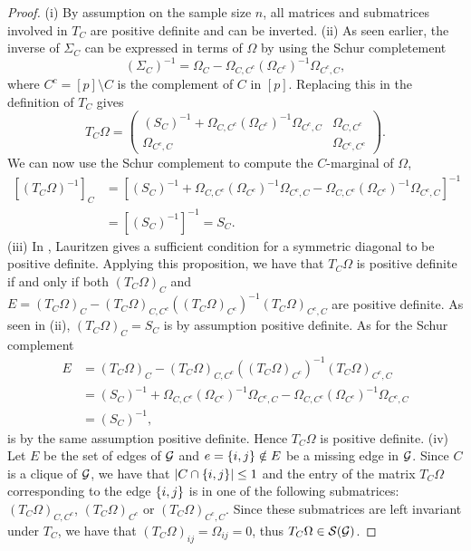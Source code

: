 \begin{proof}
    (i) By assumption on the sample size $n$, all matrices and submatrices involved in $T_C$ are positive definite and can be inverted.
    \newline
    (ii) As seen earlier, the inverse of $\Sigma_C$ can be expressed in terms of $\Omega$ by using the Schur completement
    \begin{equation*}
        (\Sigma_C)^{-1} = \Omega_C - \Omega_{C, C^c}(\Omega_{C^c})^{-1}\Omega_{C^c, C},
    \end{equation*}
    where $C^c = [p] \setminus C$ is the complement of $C$ in $[p]$. Replacing this in the definition of $T_C$ gives
    \begin{equation} \label{eq-tc-2}
        T_C \Omega = \begin{pmatrix}
            (S_C)^{-1} + \Omega_{C, C^c}(\Omega_{C^c})^{-1}\Omega_{C^c, C} & \Omega_{C, C^c}\\
            \Omega_{C^c, C} & \Omega_{C^c, C^c}
            \end{pmatrix}.
    \end{equation}
    We can now use the Schur complement to compute the $C$-marginal of $\Omega$,
    \begin{align*}
        \left[(T_C \Omega)^{-1}\right]_C 
        &= \left[ (S_C)^{-1} + \Omega_{C, C^c}(\Omega_{C^c})^{-1}\Omega_{C^c, C} - \Omega_{C, C^c}(\Omega_{C^c})^{-1}\Omega_{C^c, C} \right]^{-1}\\
        &= \left[ (S_C)^{-1}\right]^{-1} = S_C.
    \end{align*}
    (iii) In \cite[Proposition B.1]{lauritzen1996}, Lauritzen gives a sufficient condition for a symmetric diagonal to be positive definite. Applying this proposition, we have that $T_C \Omega$ is positive definite if and only if both $(T_C \Omega)_C$ and $E = (T_C \Omega)_C - (T_C \Omega)_{C, C^c}((T_C \Omega)_{C^c})^{-1}(T_C \Omega)_{C^c,C}$ are positive definite. As seen in (ii), $(T_C \Omega)_C = S_C$ is by assumption positive definite. As for the Schur complement
    \begin{align*}
        E &= (T_C \Omega)_C - (T_C \Omega)_{C, C^c}((T_C \Omega)_{C^c})^{-1}(T_C \Omega)_{C^c,C}\\
        &= (S_C)^{-1} + \Omega_{C, C^c}(\Omega_{C^c})^{-1}\Omega_{C^c, C} - \Omega_{C, C^c}(\Omega_{C^c})^{-1}\Omega_{C^c,C}\\
        &= (S_C)^{-1},
    \end{align*}
    is by the same assumption positive definite. Hence $T_C \Omega$ is positive definite.
    \newline
    (iv) Let $E$ be the set of edges of ${\mathcal{G}}$ and $e = {\left\{i, j\right\}} \notin E$ be a missing edge in ${\mathcal{G}}$. Since $C$ is a clique of ${\mathcal{G}}$, we have that $|C \cap {\left\{i, j\right\}}| \leq 1$ and the entry of the matrix $T_C \Omega$ corresponding to the edge ${\left\{i, j\right\}}$ is in one of the following submatrices: $(T_C \Omega)_{C, C^c}$, $(T_C \Omega)_{C^c}$ or $(T_C \Omega)_{C^c,C}$. Since these submatrices are left invariant under $T_C$, we have that $(T_C \Omega)_{ij} = \Omega_{ij} = 0$, thus $T_C \Omega \in {\mathcal{S}}({\mathcal{G}})$.
\end{proof}

